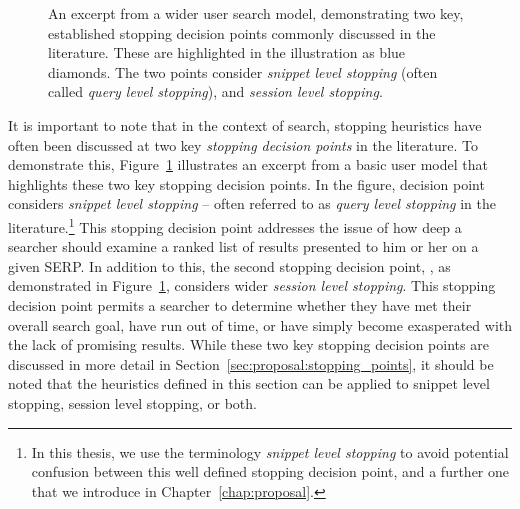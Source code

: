 \begin{figure}[t!]
    \centering
    \caption[Two main stopping decision points of the search process]{An excerpt from a wider user search model, demonstrating two key, established stopping decision points commonly discussed in the literature. These are highlighted in the illustration as {\color{dmax_lightblue}blue} diamonds. The two points consider  \emph{snippet level stopping} (often called \emph{query level stopping}), and  \emph{session level stopping}.}
    \label{fig:model_two_points}
\end{figure}

\noindent{} It is important to note that in the context of search, stopping heuristics have often been discussed at two key \emph{stopping decision points} in the literature. To demonstrate this, Figure~\ref{fig:model_two_points} illustrates an excerpt from a basic user model that highlights these two key stopping decision points. In the figure, decision point  considers \emph{snippet level stopping} -- often referred to as \emph{query level stopping} in the literature.\footnote{In this thesis, we use the terminology \emph{snippet level stopping} to avoid potential confusion between this well defined stopping decision point, and a further one that we introduce in Chapter~\ref{chap:proposal}.} This stopping decision point addresses the issue of how deep a searcher should examine a ranked list of results presented to him or her on a given SERP. In addition to this, the second stopping decision point, , as demonstrated in Figure~\ref{fig:model_two_points}, considers wider \emph{session level stopping}. This stopping decision point permits a searcher to determine whether they have met their overall search goal, have run out of time, or have simply become exasperated with the lack of promising results. While these two key stopping decision points are discussed in more detail in Section~\ref{sec:proposal:stopping_points}, it should be noted that the heuristics defined in this section can be applied to snippet level stopping, session level stopping, or both.

